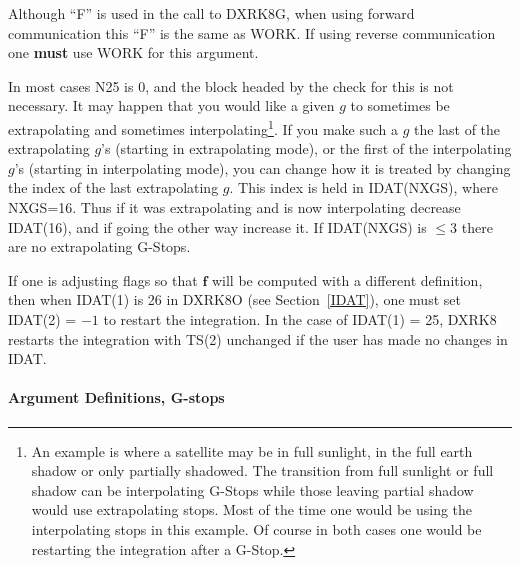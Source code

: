 \documentclass[twoside]{MATH77}
\begin{document}
Although ``F'' is used in the call to DXRK8G, when using forward
communication this ``F'' is the same as WORK.  If using reverse
communication one {\bf must} use WORK for this argument.

In most cases N25 is 0, and the block headed by the check for this is
not necessary.  It may happen that you would like a given $g$ to
sometimes be extrapolating and sometimes interpolating\footnote{An
  example is where a satellite may be in full sunlight, in the full
  earth shadow or only partially shadowed.  The transition from full
  sunlight or full shadow can be interpolating G-Stops while those
  leaving partial shadow would use extrapolating stops.  Most of the
  time one would be using the interpolating stops in this example.  Of
  course in both cases one would be restarting the integration after a
  G-Stop.}.  If you make such a $g$ the last of the extrapolating $g$'s
(starting in extrapolating mode), or the first of the interpolating
$g$'s (starting in interpolating mode), you can change how it is
treated by changing the index of the last extrapolating $g$.
This index is held in IDAT(NXGS), where NXGS=16.  Thus if it was
extrapolating and is now interpolating decrease IDAT(16), and if going
the other way increase it.  If IDAT(NXGS) is $\leq 3$ there are no
extrapolating G-Stops.

If one is adjusting flags so that $\mathbf f$ will be computed with a
different definition, then when IDAT(1) is 26 in DXRK8O (see
Section~\ref{IDAT}), one must set IDAT(2) = $-1$ to restart the
integration.  In the case of IDAT(1) = 25, DXRK8 restarts the
integration with TS(2) unchanged if the user has made no changes in
IDAT.

\paragraph{Argument Definitions, G-stops}
\end{document}
